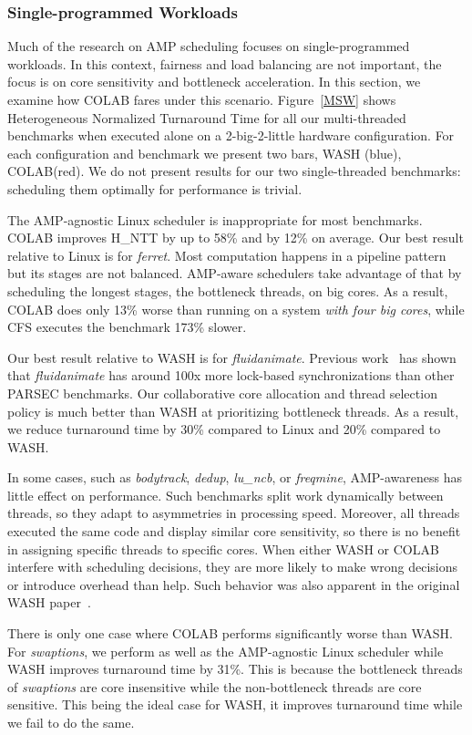 \subsubsection{Single-programmed Workloads}
Much of the research on AMP scheduling focuses on single-programmed workloads. In this context, fairness and load balancing are not important, the focus is on core sensitivity and bottleneck acceleration. In this section, we examine how COLAB fares under this scenario. Figure~\ref{MSW} shows Heterogeneous Normalized Turnaround Time for all our multi-threaded benchmarks when executed alone on a 2-big-2-little hardware configuration. For each configuration and benchmark we present two bars, WASH (blue), COLAB(red). We do not present results for our two single-threaded benchmarks: scheduling them optimally for performance is trivial.

The AMP-agnostic Linux scheduler is inappropriate for most benchmarks. COLAB improves H\_NTT by up to 58\% and by 12\% on average. Our best result relative to Linux is for \emph{ferret}. Most computation happens in a pipeline pattern but its stages are not balanced. AMP-aware schedulers take advantage of that by scheduling the longest stages, the bottleneck threads, on big cores. As a result, COLAB does only 13\% worse than running on a system \emph{with four big cores}, while CFS executes the benchmark 173\% slower.

Our best result relative to WASH is for \emph{fluidanimate}. Previous work~\cite{bienia08characterization} has shown that \emph{fluidanimate} has around 100x more lock-based synchronizations than other PARSEC benchmarks. Our collaborative core allocation and thread selection policy is much better than WASH at prioritizing bottleneck threads.  As a result, we reduce turnaround time by 30\% compared to Linux and 20\% compared to WASH.

In some cases, such as \emph{bodytrack}, \emph{dedup}, \emph{lu\_ncb}, or \emph{freqmine}, AMP-awareness has little effect on performance. Such benchmarks split work dynamically between threads, so they adapt to asymmetries in processing speed. Moreover, all threads executed the same code and display similar core sensitivity, so there is no benefit in assigning specific threads to specific cores. When either WASH or COLAB interfere with scheduling decisions, they are more likely to make wrong decisions or introduce overhead than help. Such behavior was also apparent in the original WASH paper~\cite{jibaja2016portable}.

There is only one case where COLAB performs significantly worse than WASH. For \emph{swaptions}, we perform as well as the AMP-agnostic Linux scheduler while WASH improves turnaround time by 31\%. This is because the bottleneck threads of \emph{swaptions} are core insensitive while the non-bottleneck threads are core sensitive. This being the ideal case for WASH, it improves turnaround time while we fail to do the same.

